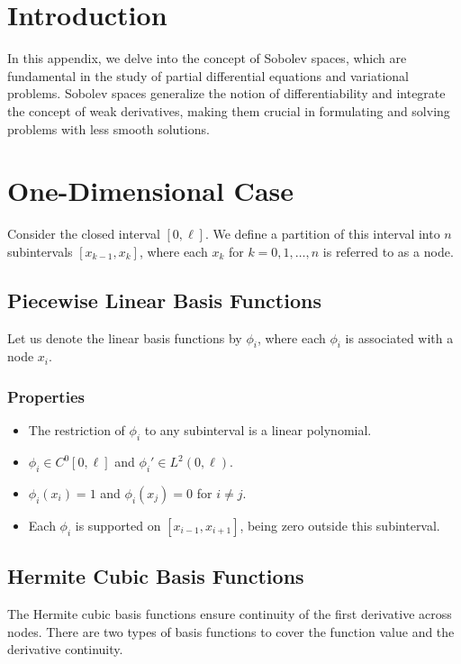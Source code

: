 \documentclass[../../main.tex]{subfiles}
\begin{document}
\section*{Introduction}
In this appendix, we delve into the concept of Sobolev spaces, which are fundamental in the study of partial differential equations and variational problems. Sobolev spaces generalize the notion of differentiability and integrate the concept of weak derivatives, making them crucial in formulating and solving problems with less smooth solutions.

\section*{One-Dimensional Case}
Consider the closed interval \([0,\ell]\). We define a partition of this interval into \(n\) subintervals \([x_{k-1},x_k]\), where each \(x_k\) for \(k=0,1,\ldots,n\) is referred to as a node.

\subsection*{Piecewise Linear Basis Functions}
Let us denote the linear basis functions by \(\phi_i\), where each \(\phi_i\) is associated with a node \(x_i\).

\subsubsection*{Properties}
\begin{itemize}
	\item The restriction of \(\phi_i\) to any subinterval is a linear polynomial.
	\item \(\phi_i \in C^0[0, \ell]\) and \(\phi_i' \in L^2(0, \ell)\).
	\item \(\phi_i(x_i) = 1\) and \(\phi_i(x_j) = 0\) for \(i \neq j\).
	\item Each \(\phi_i\) is supported on \([x_{i-1}, x_{i+1}]\), being zero outside this subinterval.
\end{itemize}

\subsection*{Hermite Cubic Basis Functions}
The Hermite cubic basis functions ensure continuity of the first derivative across nodes. There are two types of basis functions to cover the function value and the derivative continuity.
\end{document}

